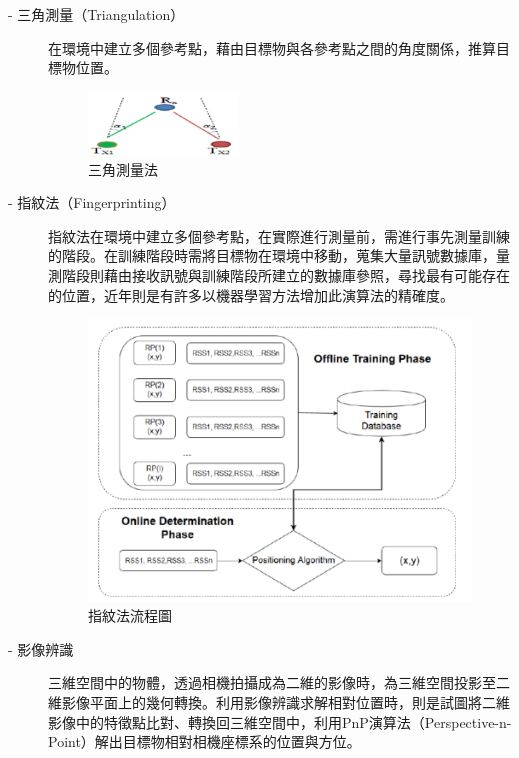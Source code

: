 \begin{description}
        \item[- 三角測量（Triangulation）] 在環境中建立多個參考點，藉由目標物與各參考點之間的角度關係，推算目標物位置。
        \begin{figure}[ht]
            \centering
            \includegraphics[width=4cm]{ch2pic/triangulation.png}
            \caption{三角測量法\cite{pic:triangulation}}
            \label{pic:triangulation}
        \end{figure}
        \item[- 指紋法（Fingerprinting）] 指紋法在環境中建立多個參考點，在實際進行測量前，需進行事先測量訓練的階段。在訓練階段時需將目標物在環境中移動，蒐集大量訊號數據庫，量測階段則藉由接收訊號與訓練階段所建立的數據庫參照，尋找最有可能存在的位置，近年則是有許多以機器學習方法增加此演算法的精確度。
        \begin{figure}[ht]
            \centering
            \includegraphics[width=13cm]{ch2pic/fingerprinting.png}
            \caption{指紋法流程圖\cite{pic:fingerprinting}}
            \label{pic:fingerprinting}
        \end{figure}
        \item[- 影像辨識]
        三維空間中的物體，透過相機拍攝成為二維的影像時，為三維空間投影至二維影像平面上的幾何轉換。利用影像辨識求解相對位置時，則是試圖將二維影像中的特徵點比對、轉換回三維空間中，利用PnP演算法（Perspective-n-Point）解出目標物相對相機座標系的位置與方位。
        \begin{figure}[ht]

\end{figure}
\end{description}
